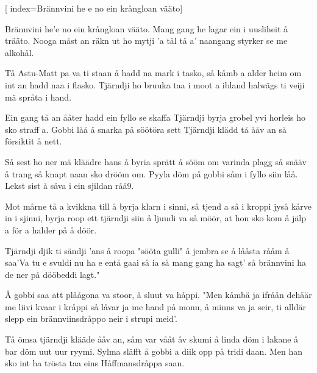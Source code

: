 

[					%
	index={Brännvini he e no ein krångloan vääto}]						%
	

\beginverse*						%
Brännvini he'e no ein krångloan vääto.
Mang gang he lagar ein i uusliheit å trääto.
Nooga måst an räkn ut ho mytji 'a tål
tå a' naangang styrker se me alkohål.
\endverse							%

\beginverse*						%
Tå Astu-Matt pa va ti staan å hadd na mark i tasko,
så kåmb a alder heim om int an hadd naa i flasko.
Tjärndji ho bruuka taa i moot a ibland
halwägs ti veiji mä språta i hand.
\endverse							%

\beginverse*						%
Ein gang tå an ååter hadd ein fyllo se skaffa
Tjärndji byrja grobel yvi horleis ho sko straff a.
Gobbi låå å snarka på söötöra sett
Tjärndji klädd tå ååv an så försiktit å nett.
\endverse							%

\beginverse*						%
Så sest ho ner mä kläädre hans å byria sprätt å sööm om
varinda plagg så snääv å trang så knapt naan sko
drööm om.
Pyyla döm på gobbi såm i fyllo siin låå.
Lekst sist å såva i ein sjildan råå9.
\endverse							%

\beginverse*						%
Mot mårne tå a kvikkna till å byrja klarn i sinni,
så tjend a så i kroppi jyså kårve in i sjinni,
byrja roop ett tjärndji siin å ljuudi va så möör,
at hon sko kom å jälp a för a halder på å döör.
\endverse							%

\beginverse*						%
Tjärndji djik ti sändji 'ans å roopa "sööta gulli"
å jembra se å lååsta rååm å saa'Va tu e svuldi
nu ha e entå gaai så ia så mang gang ha sagt'
så brännvini ha de ner på dööbeddi lagt."
\endverse							%

\beginverse*						%
Å gobbi saa att plåågona va stoor, å sluut va håppi.
"Men kåmbä ja ifråån dehäär me liivi kvaar i kråppi
så låvar ja me hand på monn, å minns va ja seir,
ti alldär slepp ein brännviinsdråppo neir i strupi meid'.
\endverse							%

\beginverse*						%
Tå ömsa tjärndji klääde ååv an, såm var vååt åv skumi
å linda döm i lakane å bar döm uut uur ryymi.
Sylma släfft å gobbi a diik opp på tridi daan.
Men han sko int ha trösta taa eins Håffmansdråppa
saan.
\endverse							%

\endsong							%